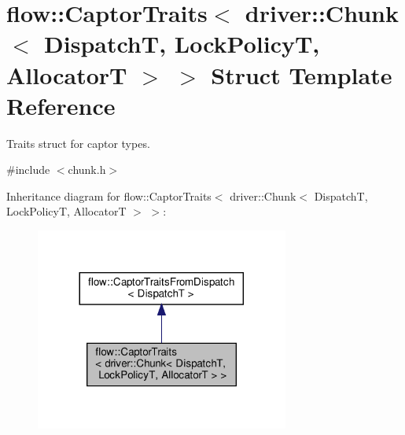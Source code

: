 \hypertarget{structflow_1_1_captor_traits_3_01driver_1_1_chunk_3_01_dispatch_t_00_01_lock_policy_t_00_01_allocator_t_01_4_01_4}{}\section{flow\+:\+:Captor\+Traits$<$ driver\+:\+:Chunk$<$ DispatchT, Lock\+PolicyT, AllocatorT $>$ $>$ Struct Template Reference}
\label{structflow_1_1_captor_traits_3_01driver_1_1_chunk_3_01_dispatch_t_00_01_lock_policy_t_00_01_allocator_t_01_4_01_4}


Traits struct for captor types.  




{\ttfamily \#include $<$chunk.\+h$>$}



Inheritance diagram for flow\+:\+:Captor\+Traits$<$ driver\+:\+:Chunk$<$ DispatchT, Lock\+PolicyT, AllocatorT $>$ $>$\+:\nopagebreak
\begin{figure}[H]
\begin{center}
\leavevmode
\includegraphics[width=236pt]{structflow_1_1_captor_traits_3_01driver_1_1_chunk_3_01_dispatch_t_00_01_lock_policy_t_00_01_alloce4e4a71d8fba95063a285e2272c05db}
\end{center}
\end{figure}



